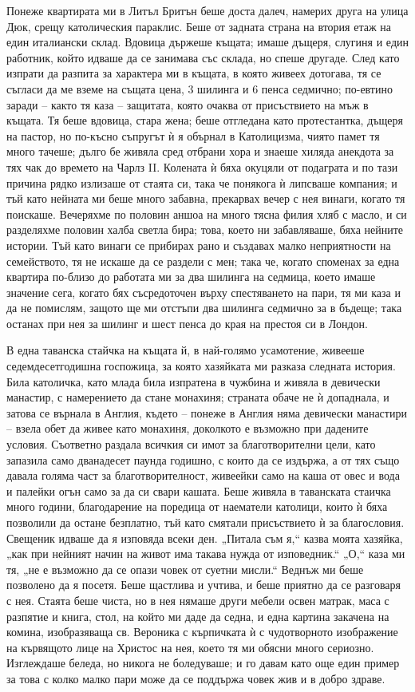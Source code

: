 \documentclass[12pt]{book}
\begin{document}
Понеже квартирата ми в Литъл Бритън беше доста далеч, намерих друга на улица Дюк, срещу католическия параклис. Беше от задната страна на втория етаж на един италиански склад. Вдовица държеше къщата; имаше дъщеря, слугиня и един работник, който идваше да се занимава със склада, но спеше другаде. След като изпрати да разпита за характера ми в къщата, в която живеех дотогава, тя се съгласи да ме вземе на същата цена, 3 шилинга и 6 пенса седмично; по-евтино заради – както тя каза – защитата, която очаква от присъствието на мъж в къщата. Тя беше вдовица, стара жена; беше отгледана като протестантка, дъщеря на пастор, но по-късно съпругът ѝ я обърнал в Католицизма, чиято памет тя много тачеше; дълго бе живяла сред отбрани хора и знаеше хиляда анекдота за тях чак до времето на Чарлз II. Колената ѝ бяха окуцяли от подаграта и по тази причина рядко излизаше от стаята си, така че понякога ѝ липсваше компания; и тъй като нейната ми беше много забавна, прекарвах вечер с нея винаги, когато тя поискаше. Вечеряхме по половин аншоа на много тясна филия хляб с масло, и си разделяхме половин халба светла бира; това, което ни забавляваше, бяха нейните истории. Тъй като винаги се прибирах рано и създавах малко неприятности на семейството, тя не искаше да се раздели с мен; така че, когато споменах за една квартира по-близо до работата ми за два шилинга на седмица, което имаше значение сега, когато бях съсредоточен върху спестяването на пари, тя ми каза и да не помислям, защото ще ми отстъпи два шилинга седмично за в бъдеще; така останах при нея за шилинг и шест пенса до края на престоя си в Лондон.

В една таванска стайчка на къщата й, в най-голямо усамотение, живееше седемдесетгодишна госпожица, за която хазяйката ми разказа следната история. Била католичка, като млада била изпратена в чужбина и живяла в девически манастир, с намерението да стане монахиня; страната обаче не ѝ допаднала, и затова се върнала в Англия, където – понеже в Англия няма девически манастири – взела обет да живее като монахиня, доколкото е възможно при дадените условия. Съответно раздала всичкия си имот за благотворителни цели, като запазила само дванадесет паунда годишно, с които да се издържа, а от тях също давала голяма част за благотворителност, живеейки само на каша от овес и вода и палейки огън само за да си свари кашата. Беше живяла в таванската стаичка много години, благодарение на поредица от наематели католици, които ѝ бяха позволили да остане безплатно, тъй като смятали присъствието ѝ за благословия. Свещеник идваше да я изповяда всеки ден. „Питала съм я,“ казва моята хазяйка, „как при нейният начин на живот има такава нужда от изповедник.“ „О,“ каза ми тя, „не е възможно да се опази човек от суетни мисли.“ Веднъж ми беше позволено да я посетя. Беше щастлива и учтива, и беше приятно да се разговаря с нея. Стаята беше чиста, но в нея нямаше други мебели освен матрак, маса с разпятие и книга, стол, на който ми даде да седна, и една картина закачена на комина, изобразяваща св. Вероника с кърпичката ѝ с чудотворното изображение на кървящото лице на Христос на нея, което тя ми обясни много сериозно. Изглеждаше беледа, но никога не боледуваше; и го давам като още един пример за това с колко малко пари може да се поддържа човек жив и в добро здраве.
\end{document}
